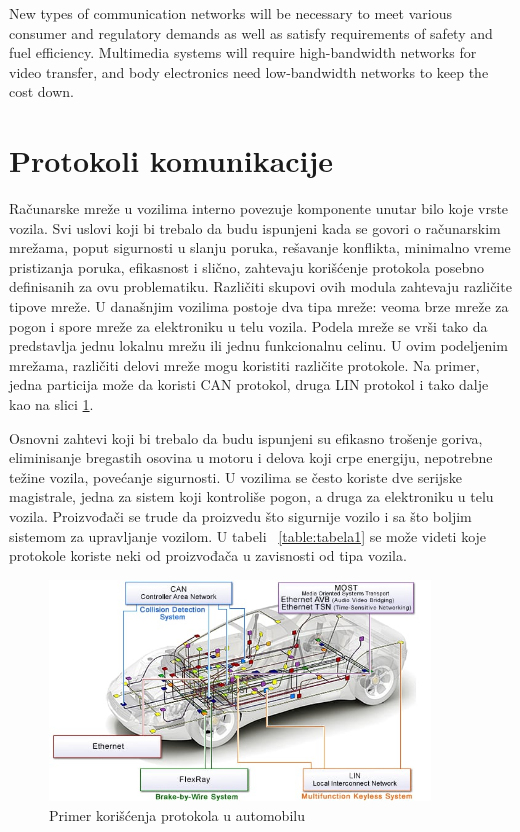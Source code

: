 \documentclass[a4paper]{article}
\begin{document}
New types of communication networks will be necessary to meet various consumer and regulatory
demands as well as satisfy requirements of safety and fuel efficiency. 
Multimedia systems will require high-bandwidth networks for
video transfer, and body electronics need low-bandwidth networks to keep the cost down.

\section{Protokoli komunikacije}
\label{sec:protokoli}

Računarske mreže u vozilima interno povezuje komponente unutar bilo koje vrste vozila. Svi uslovi koji bi trebalo da budu ispunjeni kada se govori o računarskim mrežama, poput sigurnosti u slanju poruka, rešavanje konflikta, minimalno vreme pristizanja poruka, efikasnost i slično, zahtevaju korišćenje protokola posebno definisanih za ovu problematiku. Različiti skupovi ovih modula zahtevaju različite tipove mreže. U današnjim vozilima postoje dva tipa mreže: veoma brze mreže za pogon i spore mreže za elektroniku u telu vozila. Podela mreže se vrši tako da predstavlja jednu lokalnu mrežu ili jednu funkcionalnu celinu. U ovim podeljenim mrežama, različiti delovi mreže mogu koristiti različite protokole. Na primer, jedna particija može da koristi CAN protokol, druga LIN protokol i tako dalje kao na slici \ref{fig:protokoliprimer}.

Osnovni zahtevi koji bi trebalo da budu ispunjeni su efikasno trošenje goriva, eliminisanje bregastih osovina u motoru i delova koji crpe energiju, nepotrebne težine vozila, povećanje sigurnosti. U vozilima se često koriste dve serijske magistrale, jedna za sistem koji kontroliše pogon, a druga za elektroniku u telu vozila. Proizvođači se trude da proizvedu što sigurnije vozilo i sa što boljim sistemom za upravljanje vozilom. U tabeli ~\ref{table:tabela1}  se može videti koje protokole koriste neki od proizvođača u zavisnosti od tipa vozila.

\begin{figure}[h]
\centering
 \includegraphics[width=0.9\textwidth]{protokoliprimer}
 \caption{Primer korišćenja protokola u automobilu}
 \label{fig:protokoliprimer}
\end{figure}
\end{document}
